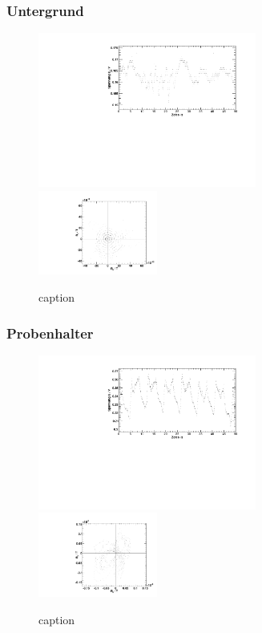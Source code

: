 \subsubsection{Untergrund}
\begin{figure}[H]
\begin{center}
  \includegraphics[width=0.64\textwidth]{../img/Untergrund.pdf}
  \includegraphics[width=0.35\textwidth]{../img/polar_Untergrund.pdf}
  \caption{caption}
  \label{img:underground}
\end{center}
\end{figure}

\subsubsection{Probenhalter}
\begin{figure}[H]
\begin{center}
  \includegraphics[width=0.64\textwidth]{../img/emptyHolder.pdf}
  \includegraphics[width=0.35\textwidth]{../img/polar_emptyHolder.pdf}
  \caption{caption}
  \label{img:holder}
\end{center}
\end{figure}
